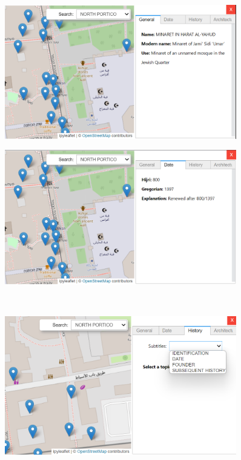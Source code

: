 \begin{figure}[H]
    \centering
    \begin{minipage}[c]{.5\linewidth}
        \centering
        \includegraphics[width=0.9\textwidth]{Images/general.png}
        \label{fig:general}
    \end{minipage}\hfill
    \begin{minipage}[c]{.5\linewidth}
        \centering
        \includegraphics[width=0.9\textwidth]{Images/date.png}
        \label{fig:date}
    \end{minipage}\\[0.3cm]
    \begin{minipage}[c]{.5\linewidth}
        \centering
        \includegraphics[width=0.9\textwidth]{Images/history.png}

\end{minipage}
\end{figure}
